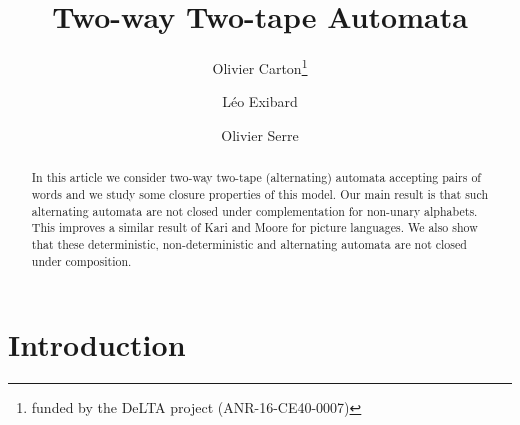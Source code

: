 \documentclass[runningheads, envcountsame, a4paper]{llncs}
\begin{document}
% 
\frontmatter          %
%
\pagestyle{headings}  %
%
%
\mainmatter              %
%
\title{Two-way Two-tape Automata}
%
%
\author{Olivier Carton\fnmsep\thanks{funded by the DeLTA project (ANR-16-CE40-0007)} \and
      L\'{e}o Exibard \and Olivier Serre}
%
%
%

\maketitle              %

\setcounter{footnote}{0} %

\begin{abstract}
  In this article we consider two-way two-tape (alternating) automata
  accepting pairs of words and we study some closure properties of this
  model.  Our main result is that such alternating automata are not closed
  under complementation for non-unary alphabets.  This improves a similar
  result of Kari and Moore for picture languages.  We also show that these
  deterministic, non-deterministic and alternating automata are not closed
  under composition.
\end{abstract}

\section{Introduction}
\end{document}
